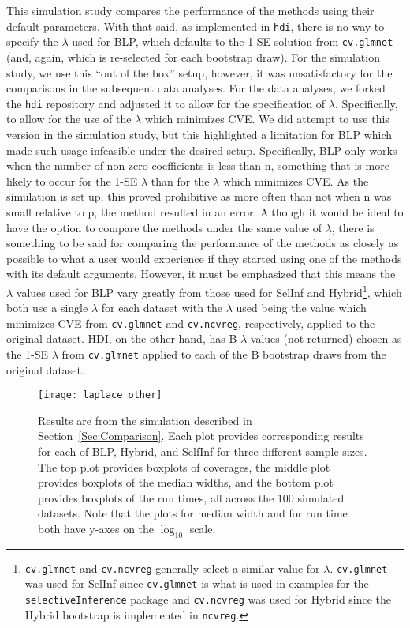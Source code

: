 This simulation study compares the performance of the methods using their default parameters. With that said, as implemented in \texttt{hdi}, there is no way to specify the $\lambda$ used for BLP, which defaults to the 1-SE solution from \texttt{cv.glmnet} (and, again, which is re-selected for each bootstrap draw). For the simulation study, we use this ``out of the box'' setup, however, it was unsatisfactory for the comparisons in the subsequent data analyses. For the data analyses, we forked the \texttt{hdi} repository and adjusted it to allow for the specification of $\lambda$. Specifically, to allow for the use of the $\lambda$ which minimizes CVE. We did attempt to use this version in the simulation study, but this highlighted a limitation for BLP which made such usage infeasible under the desired setup. Specifically, BLP only works when the number of non-zero coefficients is less than n, something that is more likely to occur for the 1-SE $\lambda$ than for the $\lambda$ which minimizes CVE. As the simulation is set up, this proved prohibitive as more often than not when n was small relative to p, the method resulted in an error. Although it would be ideal to have the option to compare the methods under the same value of $\lambda$, there is something to be said for comparing the performance of the methods as closely as possible to what a user would experience if they started using one of the methods with its default arguments. However, it must be emphasized that this means the $\lambda$ values used for BLP vary greatly from those used for SelInf and Hybrid\footnote{\texttt{cv.glmnet} and \texttt{cv.ncvreg} generally select a similar value for $\lambda$. \texttt{cv.glmnet} was used for SelInf since \texttt{cv.glmnet} is what is used in examples for the \texttt{selectiveInference} package and \texttt{cv.ncvreg} was used for Hybrid since the Hybrid bootstrap is implemented in \texttt{ncvreg}.}, which both use a single $\lambda$ for each dataset with the $\lambda$ used being the value which minimizes CVE from \texttt{cv.glmnet} and \texttt{cv.ncvreg}, respectively, applied to the original dataset. HDI, on the other hand, has B $\lambda$ values (not returned) chosen as the 1-SE $\lambda$ from \texttt{cv.glmnet} applied to each of the B bootstrap draws from the original dataset.

\begin{figure}[hbtp]
  \texttt{[image: laplace\_other]}
  \caption{\label{Fig:laplace_other} Results are from the simulation described in Section~\ref{Sec:Comparison}. Each plot provides corresponding results for each of BLP, Hybrid, and SelfInf for three different sample sizes. The top plot provides boxplots of coverages, the middle plot provides boxplots of the median widths, and the bottom plot provides boxplots of the run times, all across the 100 simulated datasets. Note that the plots for median width and for run time both have y-axes on the $\log_10$ scale.}
\end{figure}


